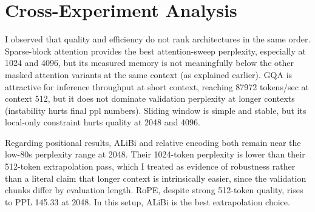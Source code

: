 \documentclass[11pt]{article}
\begin{document}
\section{Cross-Experiment Analysis}
I observed that quality and efficiency do not rank architectures in the same order. Sparse-block attention provides the best attention-sweep perplexity, especially at 1024 and 4096, but its measured memory is not meaningfully below the other masked attention variants at the same context (as explained earlier). GQA is attractive for inference throughput at short context, reaching 87972 tokens/sec at context 512, but it does not dominate validation perplexity at longer contexts (instability hurts final ppl numbers). Sliding window is simple and stable, but its local-only constraint hurts quality at 2048 and 4096.

Regarding positional results, ALiBi and relative encoding both remain near the low-80s perplexity range at 2048. Their 1024-token perplexity is lower than their 512-token extrapolation pass, which I treated as evidence of robustness rather than a literal claim that longer context is intrinsically easier, since the validation chunks differ by evaluation length. RoPE, despite strong 512-token quality, rises to PPL 145.33 at 2048. In this setup, ALiBi is the best extrapolation choice.

\begin{table}[H]
\centering
\small
\caption{Final decision table.}
\label{tab:winners}
\end{table}
\end{document}
